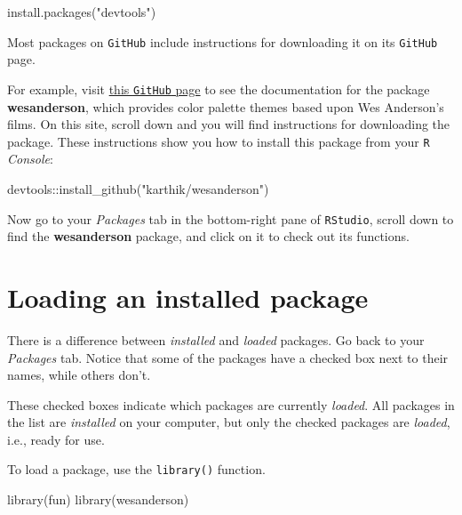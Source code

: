 \documentclass[
]{book}
\newenvironment{Shaded}{\begin{snugshade}}{\end{snugshade}}
\newcommand{\FunctionTok}[1]{\textcolor[rgb]{0.00,0.00,0.00}{#1}}
\newcommand{\NormalTok}[1]{#1}
\newcommand{\SpecialCharTok}[1]{\textcolor[rgb]{0.00,0.00,0.00}{#1}}
\newcommand{\StringTok}[1]{\textcolor[rgb]{0.31,0.60,0.02}{#1}}
\begin{document}
\begin{Shaded}
\begin{Highlighting}[]
\FunctionTok{install.packages}\NormalTok{(}\StringTok{"devtools"}\NormalTok{)}
\end{Highlighting}
\end{Shaded}

Most packages on \texttt{GitHub} include instructions for downloading it on its \texttt{GitHub} page.

For example, visit \href{https://github.com/karthik/wesanderson}{this \texttt{GitHub} page} to see the documentation for the package \textbf{wesanderson}, which provides color palette themes based upon Wes Anderson's films. On this site, scroll down and you will find instructions for downloading the package. These instructions show you how to install this package from your \texttt{R} \emph{Console}:

\begin{Shaded}
\begin{Highlighting}[]
\NormalTok{devtools}\SpecialCharTok{::}\FunctionTok{install\_github}\NormalTok{(}\StringTok{"karthik/wesanderson"}\NormalTok{)}
\end{Highlighting}
\end{Shaded}

Now go to your \emph{Packages} tab in the bottom-right pane of \texttt{RStudio}, scroll down to find the \textbf{wesanderson} package, and click on it to check out its functions.

\hypertarget{loading-an-installed-package}{%
\section*{Loading an installed package}\label{loading-an-installed-package}}

There is a difference between \emph{installed} and \emph{loaded} packages. Go back to your \emph{Packages} tab. Notice that some of the packages have a checked box next to their names, while others don't.

These checked boxes indicate which packages are currently \emph{loaded}. All packages in the list are \emph{installed} on your computer, but only the checked packages are \emph{loaded}, i.e., ready for use.

To load a package, use the \texttt{library()} function.

\begin{Shaded}
\begin{Highlighting}[]
\FunctionTok{library}\NormalTok{(fun)}
\FunctionTok{library}\NormalTok{(wesanderson)}
\end{Highlighting}
\end{Shaded}
\end{document}
